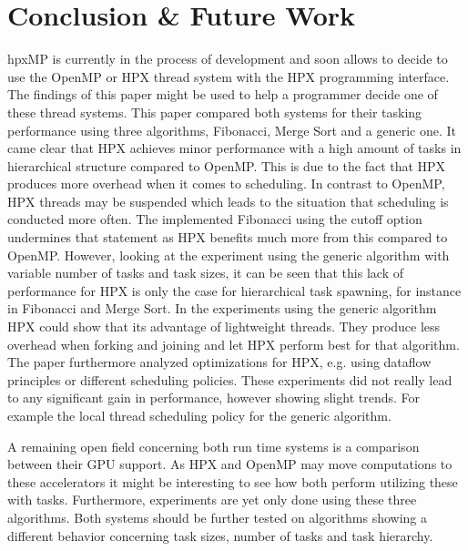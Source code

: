 \section{Conclusion \& Future Work}
hpxMP is currently in the process of development and soon allows to decide to use the OpenMP or HPX thread system with the HPX programming interface.
The findings of this paper might be used to help a programmer decide one of these thread systems.
This paper compared both systems for their tasking performance using three algorithms, Fibonacci, Merge Sort and a generic one.
It came clear that HPX achieves minor performance with a high amount of tasks in hierarchical structure compared to OpenMP.
This is due to the fact that HPX produces more overhead when it comes to scheduling.
In contrast to OpenMP, HPX threads may be suspended which leads to the situation that scheduling is conducted more often.
The implemented Fibonacci using the cutoff option undermines that statement as HPX benefits much more from this compared to OpenMP.
However, looking at the experiment using the generic algorithm with variable number of tasks and task sizes, it can be seen that this lack of performance for HPX is only the case for hierarchical task spawning, for instance in Fibonacci and Merge Sort.
In the experiments using the generic algorithm HPX could show that its advantage of lightweight threads.
They produce less overhead when forking and joining and let HPX perform best for that algorithm.
The paper furthermore analyzed optimizations for HPX, e.g. using dataflow principles or different scheduling policies.
These experiments did not really lead to any significant gain in performance, however showing slight trends.
For example the local thread scheduling policy for the generic algorithm.


A remaining open field concerning both run time systems is a comparison between their GPU support.
As HPX and OpenMP may move computations to these accelerators it might be interesting to see how both perform utilizing these with tasks.
Furthermore, experiments are yet only done using these three algorithms.
Both systems should be further tested on algorithms showing a different behavior concerning task sizes, number of tasks and task hierarchy.
